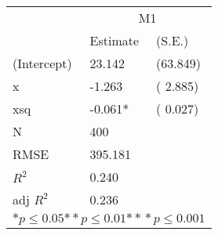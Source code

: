 \begin{tabular}{*{3}{l}}
\hline
                  & \multicolumn{2}{c}{M1}   \tabularnewline
                   &Estimate  &(S.E.)  \tabularnewline
 \hline
 \hline
   (Intercept)     &23.142   &   (63.849) \tabularnewline
   x               &-1.263   &   ( 2.885) \tabularnewline
   xsq             &-0.061*   &   ( 0.027) \tabularnewline
 \hline
 N                 &400       &        \tabularnewline
 RMSE             &395.181         & \tabularnewline
 $R^2$             &0.240         & \tabularnewline
 adj $R^2$         &0.236         & \tabularnewline
 \hline
\hline
 
 \multicolumn{3}{c}{${*  p}\le 0.05$${*\!\!*  p}\le 0.01$${*\!\!*\!\!*  p}\le 0.001$}\tabularnewline
 \end{tabular}